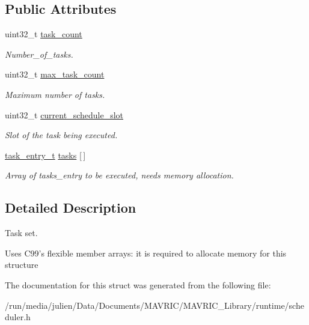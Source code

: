 \subsection*{Public Attributes}
\begin{DoxyCompactItemize}
\item 
\hypertarget{structtask__set__t_a3dccd2f572c25005186e50f8e19db7b6}{uint32\+\_\+t \hyperlink{structtask__set__t_a3dccd2f572c25005186e50f8e19db7b6}{task\+\_\+count}}\label{structtask__set__t_a3dccd2f572c25005186e50f8e19db7b6}

\begin{DoxyCompactList}\small\item\em Number\+\_\+of\+\_\+tasks. \end{DoxyCompactList}\item 
\hypertarget{structtask__set__t_a3cdcc50bd693e5f0e6d6bd74b6f7ffff}{uint32\+\_\+t \hyperlink{structtask__set__t_a3cdcc50bd693e5f0e6d6bd74b6f7ffff}{max\+\_\+task\+\_\+count}}\label{structtask__set__t_a3cdcc50bd693e5f0e6d6bd74b6f7ffff}

\begin{DoxyCompactList}\small\item\em Maximum number of tasks. \end{DoxyCompactList}\item 
\hypertarget{structtask__set__t_ae14070a14b8bdf852c8784fe5ad7174d}{uint32\+\_\+t \hyperlink{structtask__set__t_ae14070a14b8bdf852c8784fe5ad7174d}{current\+\_\+schedule\+\_\+slot}}\label{structtask__set__t_ae14070a14b8bdf852c8784fe5ad7174d}

\begin{DoxyCompactList}\small\item\em Slot of the task being executed. \end{DoxyCompactList}\item 
\hypertarget{structtask__set__t_a39230e1a8d46810fa128c6116744702a}{\hyperlink{structtask__entry__t}{task\+\_\+entry\+\_\+t} \hyperlink{structtask__set__t_a39230e1a8d46810fa128c6116744702a}{tasks} \mbox{[}$\,$\mbox{]}}\label{structtask__set__t_a39230e1a8d46810fa128c6116744702a}

\begin{DoxyCompactList}\small\item\em Array of tasks\+\_\+entry to be executed, needs memory allocation. \end{DoxyCompactList}\end{DoxyCompactItemize}


\subsection{Detailed Description}
Task set. 

Uses C99's flexible member arrays\+: it is required to allocate memory for this structure 

The documentation for this struct was generated from the following file\+:\begin{DoxyCompactItemize}
\item 
/run/media/julien/\+Data/\+Documents/\+M\+A\+V\+R\+I\+C/\+M\+A\+V\+R\+I\+C\+\_\+\+Library/runtime/scheduler.\+h\end{DoxyCompactItemize}
